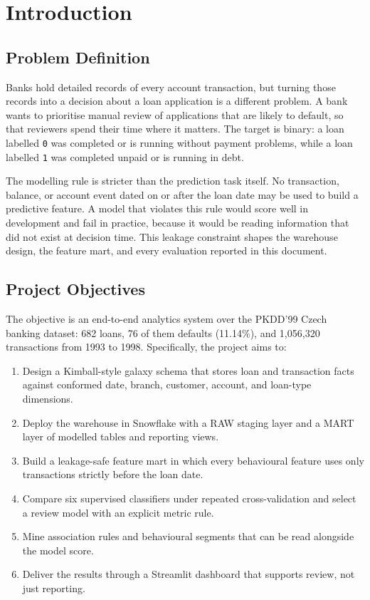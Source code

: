 \chapter{Introduction}
\section{Problem Definition}
Banks hold detailed records of every account transaction, but turning those records into a decision about a loan application is a different problem. A bank wants to prioritise manual review of applications that are likely to default, so that reviewers spend their time where it matters. The target is binary: a loan labelled \texttt{0} was completed or is running without payment problems, while a loan labelled \texttt{1} was completed unpaid or is running in debt.

The modelling rule is stricter than the prediction task itself. No transaction, balance, or account event dated on or after the loan date may be used to build a predictive feature. A model that violates this rule would score well in development and fail in practice, because it would be reading information that did not exist at decision time. This leakage constraint shapes the warehouse design, the feature mart, and every evaluation reported in this document.

\section{Project Objectives}
The objective is an end-to-end analytics system over the PKDD'99 Czech banking dataset: 682 loans, 76 of them defaults (11.14\%), and 1,056,320 transactions from 1993 to 1998. Specifically, the project aims to:

\begin{enumerate}
    \item Design a Kimball-style galaxy schema that stores loan and transaction facts against conformed date, branch, customer, account, and loan-type dimensions.
    \item Deploy the warehouse in Snowflake with a RAW staging layer and a MART layer of modelled tables and reporting views.
    \item Build a leakage-safe feature mart in which every behavioural feature uses only transactions strictly before the loan date.
    \item Compare six supervised classifiers under repeated cross-validation and select a review model with an explicit metric rule.
    \item Mine association rules and behavioural segments that can be read alongside the model score.
    \item Deliver the results through a Streamlit dashboard that supports review, not just reporting.
\end{enumerate}


